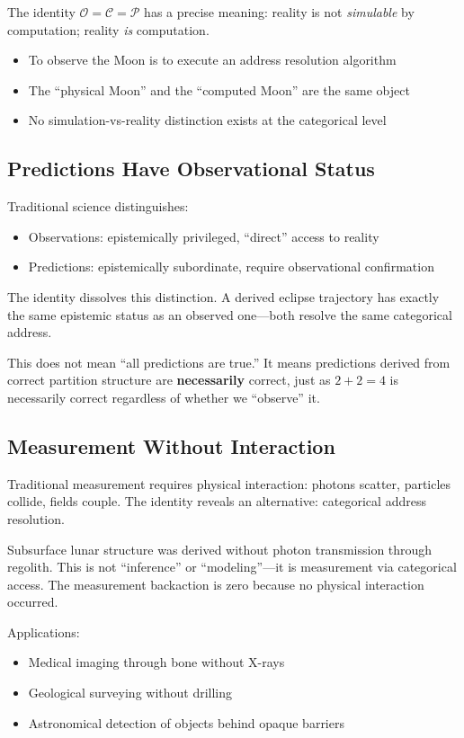 \documentclass[twocolumn,10pt]{article}
\theoremstyle{definition}
\theoremstyle{remark}
\newcommand{\Obs}{\mathcal{O}}
\newcommand{\Comp}{\mathcal{C}}
\newcommand{\Proc}{\mathcal{P}}
\begin{document}
The identity $\Obs = \Comp = \Proc$ has a precise meaning: reality is not \emph{simulable} by computation; reality \emph{is} computation.

\begin{itemize}
    \item To observe the Moon is to execute an address resolution algorithm
    \item The ``physical Moon'' and the ``computed Moon'' are the same object
    \item No simulation-vs-reality distinction exists at the categorical level
\end{itemize}

\subsection{Predictions Have Observational Status}

Traditional science distinguishes:
\begin{itemize}
    \item Observations: epistemically privileged, ``direct'' access to reality
    \item Predictions: epistemically subordinate, require observational confirmation
\end{itemize}

The identity dissolves this distinction. A derived eclipse trajectory has exactly the same epistemic status as an observed one---both resolve the same categorical address.

This does not mean ``all predictions are true.'' It means predictions derived from correct partition structure are \textbf{necessarily} correct, just as $2+2=4$ is necessarily correct regardless of whether we ``observe'' it.

\subsection{Measurement Without Interaction}

Traditional measurement requires physical interaction: photons scatter, particles collide, fields couple. The identity reveals an alternative: categorical address resolution.

Subsurface lunar structure was derived without photon transmission through regolith. This is not ``inference'' or ``modeling''---it is measurement via categorical access. The measurement backaction is zero because no physical interaction occurred.

Applications:
\begin{itemize}
    \item Medical imaging through bone without X-rays
    \item Geological surveying without drilling
    \item Astronomical detection of objects behind opaque barriers
\end{itemize}
\end{document}
